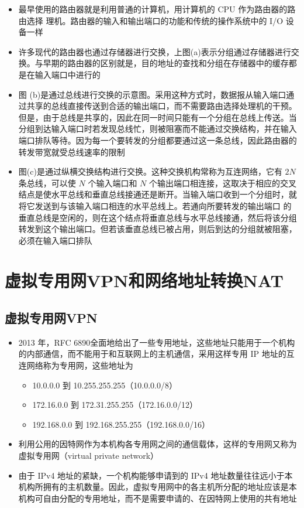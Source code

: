 \documentclass[cs4size,a4paper,10pt]{ctexart}
\begin{document}
	\begin{itemize}
		\item 最早使用的路由器就是利用普通的计算机，用计算机的 CPU 作为路由器的路由选择 理机。路由器的输入和输出端口的功能和传统的操作系统中的 I/O 设备一样
		\item 许多现代的路由器也通过存储器进行交换，上图(a)表示分组通过存储器进行交换。与早期的路由器的区别就是，目的地址的查找和分组在存储器中的缓存都是在输入端口中进行的
		\item 图 (b)是通过总线进行交换的示意图。采用这种方式时，数据报从输入端口通过共享的总线直接传送到合适的输出端口，而不需要路由选择处理机的干预。但是，由于总线是共享的，因此在同一时间只能有一个分组在总线上传送。当分组到达输入端口时若发现总线忙，则被阻塞而不能通过交换结构，并在输入端口排队等待。因为每一个要转发的分组都要通过这一条总线，因此路由器的转发带宽就受总线速率的限制
		\item 图(c)是通过纵横交换结构进行交换。这种交换机构常称为互连网络，它有 $2N$ 条总线，可以使 $N$ 个输入端口和 $N$ 个输出端口相连接，这取决于相应的交叉结点是使水平总线和垂直总线接通还是断开。当输入端口收到一个分组时，就将它发送到与该输入端口相连的水平总线上。若通向所要转发的输出端口 的垂直总线是空闲的，则在这个结点将垂直总线与水平总线接通，然后将该分组转发到这个输出端口。但若该垂直总线已被占用，则后到达的分组就被阻塞，必须在输入端口排队
	\end{itemize}

	\section{虚拟专用网VPN和网络地址转换NAT}

	\subsection{虚拟专用网VPN}
	\begin{itemize}
		\item 2013 年，RFC 6890全面地给出了一些专用地址，这些地址只能用于一个机构的内部通信，而不能用于和互联网上的主机通信，采用这样专用 IP 地址的互连网络称为专用网，这些地址为
		\begin{itemize}
			\item 10.0.0.0 到 10.255.255.255（10.0.0.0/8）
			\item 172.16.0.0 到 172.31.255.255（172.16.0.0/12）
			\item 192.168.0.0 到 192.168.255.255（192.168.0.0/16）
		\end{itemize}
		\item 利用公用的因特网作为本机构各专用网之间的通信载体，这样的专用网又称为虚拟专用网（virtual private network）
		\item 由于 IPv4 地址的紧缺，一个机构能够申请到的 IPv4 地址数量往往远小于本机构所拥有的主机数量。因此，虚拟专用网中的各主机所分配的地址应该是本机构可自由分配的专用地址，而不是需要申请的、在因特网上使用的共有地址
	\end{itemize}
\end{document}
